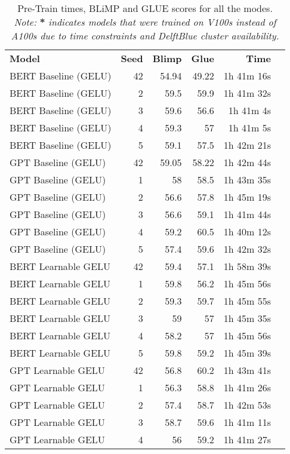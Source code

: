 \begin{table}[!htp]\centering
    \caption{Pre-Train times, BLiMP and GLUE scores for all the modes. \textit{Note:} \textbf{*} \textit{indicates models that were trained on V100s instead of A100s due to time constraints and DelftBlue cluster availability.}}
    \label{tab:all-results}
    \scriptsize
    \begin{tabular}{lrrrrr}\toprule
    \textbf{Model} &\textbf{Seed} &\textbf{Blimp} &\textbf{Glue} &\textbf{Time} \\\cmidrule{1-5}
    BERT Baseline (GELU) &42 &54.94 &49.22 &1h 41m 16s \\
    BERT Baseline (GELU) &2 &59.5 &59.9 &1h 41m 32s \\
    BERT Baseline (GELU) &3 &59.6 &56.6 &1h 41m 4s \\
    BERT Baseline (GELU) &4 &59.3 &57 &1h 41m 5s \\
    BERT Baseline (GELU) &5 &59.1 &57.5 &1h 42m 21s \\
    GPT Baseline (GELU) &42 &59.05 &58.22 &1h 42m 44s \\
    GPT Baseline (GELU) &1 &58 &58.5 &1h 43m 35s \\
    GPT Baseline (GELU) &2 &56.6 &57.8 &1h 45m 19s \\
    GPT Baseline (GELU) &3 &56.6 &59.1 &1h 41m 44s \\
    GPT Baseline (GELU) &4 &59.2 &60.5 &1h 40m 12s \\
    GPT Baseline (GELU) &5 &57.4 &59.6 &1h 42m 32s \\
    BERT Learnable GELU &42 &59.4 &57.1 &1h 58m 39s \\
    BERT Learnable GELU &1 &59.8 &56.2 &1h 45m 56s \\
    BERT Learnable GELU &2 &59.3 &59.7 &1h 45m 55s \\
    BERT Learnable GELU &3 &59 &57 &1h 45m 35s \\
    BERT Learnable GELU &4 &58.2 &57 &1h 45m 56s \\
    BERT Learnable GELU &5 &59.8 &59.2 &1h 45m 39s \\
    GPT Learnable GELU &42 &56.8 &60.2 &1h 43m 41s \\
    GPT Learnable GELU &1 &56.3 &58.8 &1h 41m 26s \\
    GPT Learnable GELU &2 &57.4 &58.7 &1h 42m 53s \\
    GPT Learnable GELU &3 &58.7 &59.6 &1h 41m 11s \\
    GPT Learnable GELU &4 &56 &59.2 &1h 41m 27s \\

\end{tabular}
\end{table}
